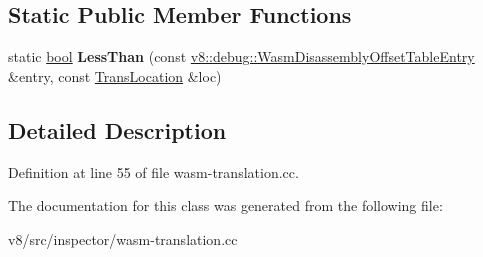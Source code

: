\subsection*{Static Public Member Functions}
\begin{DoxyCompactItemize}
\item 
\mbox{\label{classv8__inspector_1_1WasmTranslation_1_1TranslatorImpl_a5cf3a7136d378073a59cabaa8f593d75}} 
static \mbox{\hyperlink{classbool}{bool}} {\bfseries Less\+Than} (const \mbox{\hyperlink{structv8_1_1debug_1_1WasmDisassemblyOffsetTableEntry}{v8\+::debug\+::\+Wasm\+Disassembly\+Offset\+Table\+Entry}} \&entry, const \mbox{\hyperlink{structv8__inspector_1_1WasmTranslation_1_1TranslatorImpl_1_1TransLocation}{Trans\+Location}} \&loc)
\end{DoxyCompactItemize}


\subsection{Detailed Description}


Definition at line 55 of file wasm-\/translation.\+cc.



The documentation for this class was generated from the following file\+:\begin{DoxyCompactItemize}
\item 
v8/src/inspector/wasm-\/translation.\+cc\end{DoxyCompactItemize}
